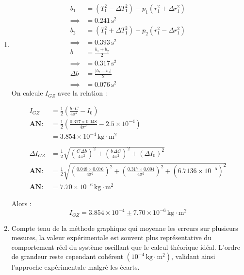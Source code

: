\begin{enumerate}
    Alors : $$m = 0.194 \pm 0.020 \, \text{kg}$$
    
    \item 
    \begin{align*}
        b_1 & = (T^2_1 - \Delta T^2_1) - p_1 (r^2_1 + \Delta r^2_1) \\
        \implies & = 0.241 \, \text{s}^2 \\
        b_2 & = (T^2_1 + \Delta T^2_1) - p_2 (r^2_1 - \Delta r^2_1) \\
        \implies & = 0.393 \, \text{s}^2 \\
        b & = \frac{b_1 + b_2}{2} \\
        \implies & = 0.317 \, \text{s}^2 \\
        \Delta b & = \frac{|b_2 - b_1|}{2} \\
        \implies & = 0.076 \, \text{s}^2 
    \end{align*} 
    On calcule $I_{GZ}$ avec la relation : 

    \begin{align*}
        I_{GZ} & = \frac{1}{2}\left(\frac{b \cdot C}{4\pi^2} - I_0\right) \\
        \textbf{AN: } 
        & = \frac{1}{2}\left(\frac{0.317 \times 0.048}{4\pi^2} - 2.5 \times 10^{-4}\right) \\
        & = 3.854 \times 10^{-4}\,\text{kg}\cdot\text{m}^2 \\
        \\
        \Delta I_{GZ} & =
        \frac{1}{2}
        \sqrt{
            \left(\frac{C\,\Delta b}{4\pi^2}\right)^2
            + \left(\frac{b\,\Delta C}{4\pi^2}\right)^2
            + (\Delta I_0)^2
        } \\
        \textbf{AN: } 
        & = \frac{1}{2}
        \sqrt{
            \left(\frac{0.048 \times 0.076}{4\pi^2}\right)^2
            + \left(\frac{0.317 \times 0.004}{4\pi^2}\right)^2
            + (6.7136 \times 10^{-5})^2
        } \\
        \textbf{AN: } 
        & = 7.70 \times 10^{-6}\,\text{kg}\cdot\text{m}^2
    \end{align*}

    Alors : $$I_{GZ} = 3.854 \times 10^{-4} \pm 7.70 \times 10^{-6} \, \text{kg}\cdot\text{m}^2$$

    \item 
    Compte tenu de la méthode graphique qui moyenne les erreurs sur plusieurs mesures, la valeur expérimentale est souvent plus représentative du comportement réel du système oscillant que le calcul théorique idéal. L'ordre de grandeur reste cependant cohérent $(10^{-4} \, \text{kg}\cdot\text{m}^2)$, validant ainsi l'approche expérimentale malgré les écarts. 

\end{enumerate}